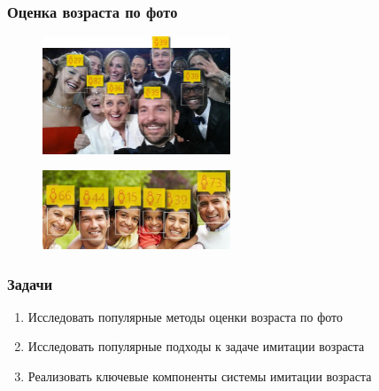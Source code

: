 \documentclass{beamer}
\begin{document}
  \begin{frame}
	\frametitle{Оценка возраста по фото}
	\begin{figure}
  		\includegraphics[width=0.5\textwidth,keepaspectratio]{how_old.jpeg}
	\end{figure}
	\begin{figure}
  		\includegraphics[width=0.5\textwidth,keepaspectratio]{how_old2.jpg}				
	\end{figure}
  \end{frame}
  
  \begin{frame}
    \frametitle{Задачи}
    \begin{enumerate}
		\item Исследовать популярные методы оценки возраста по фото
    		\item Исследовать популярные подходы к задаче имитации возраста
    		\item Реализовать ключевые компоненты системы имитации возраста
    \end{enumerate}
  \end{frame}
  
\end{document}
